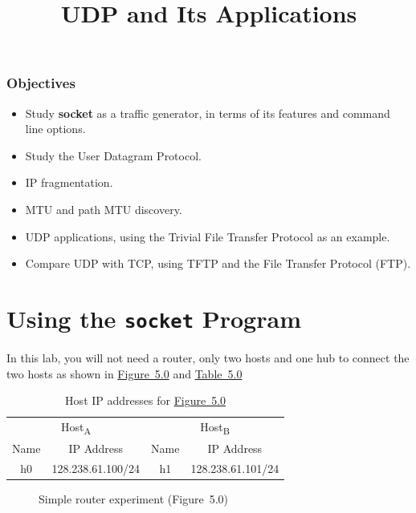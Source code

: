 \documentclass{UTNetLab}
\title{UDP and Its Applications}
\begin{document}
	\section*{Objectives}
	\begin{itemize}
		\item Study \textbf{socket} as a traffic generator, in terms of its features and command line options.
		\item Study the User Datagram Protocol.
		\item IP fragmentation.
		\item MTU and path MTU discovery.
		\item UDP applications, using the Trivial File Transfer Protocol as an example.
		\item Compare UDP with TCP, using TFTP and the File Transfer Protocol (FTP).
	\end{itemize}
	
\part{Using the \texttt{socket} Program}
\label{sec:schema}
    In this lab, you will not need a router, only two hosts and one hub to connect the two hosts as shown in \hyperref[fig:5.0]{Figure~5.0} and \hyperref[tab:5.0]{Table~5.0}
    \begin{table}[H]
        \caption{Host IP addresses for \hyperref[fig:5.0]{Figure~5.0}}
        \label{tab:5.0}
        \centering
        \begin{tabular}{ *2c|*2c }
            \hline \hline
            \multicolumn{2}{c|}{Host\textsubscript{A}} & \multicolumn{2}{c}{Host\textsubscript{B}} \\
            Name & IP Address & Name & IP Address \\
            \hline 
            h0 & 128.238.61.100/24 & h1 & 128.238.61.101/24\\
            \hline \hline
            \end{tabular}
    \end{table}

    \begin{figure}[H]
        \centering
        \caption{Simple router experiment (Figure~5.0)}        
        \label{fig:5.0}
    \end{figure}
\end{document}
